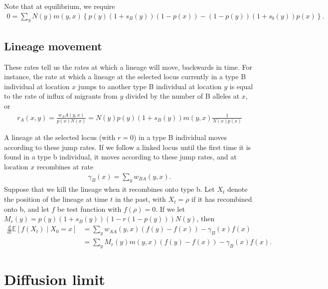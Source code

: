\documentclass{article}
\newcommand{\E}{\mathbb{E}}
\newcommand{\deriv}[1]{\frac{d}{d#1}}
\newcommand{\given}{\;\vert\;}
\begin{document}
Note that at equilibrium, we require
\begin{align}
  0 = \sum_y N(y) m(y,x) \left\{ p(y)(1+s_B(y))(1-p(x)) - (1-p(y))(1+s_b(y))p(x) \right\} .
\end{align}

\subsection{Lineage movement}

These rates tell us the rates at which a lineage will move, backwards in time.
For instance, the rate at which a lineage at the selected locus
currently in a type B individual at location $x$
jumps to another type B individual at location $y$ is equal to the rate of influx of migrants from $y$
divided by the number of B alleles at $x$,
or
\begin{align}
  r_A(x,y) = \frac{w_AA(y,x)}{p(x)N(x)} = N(y) p(y)  (1+s_B(y)) m(y,x) \frac{ 1 }{ N(x) p(x) }
\end{align}


A lineage at the selected locus (with $r=0$) in a type B individual moves according to these jump rates.
If we follow a linked locus until the first time it is found in a type b individual,
it moves according to these jump rates, and at location $x$ recombines at rate
\begin{align}
    \gamma_B(x) = \sum_y w_{BA}(y,x) .
\end{align}
Suppose that we kill the lineage when it recombines onto type b.
Let $X_t$ denote the position of the lineage at time $t$ in the past,
with $X_t = \rho$ if it has recombined onto b,
and let $f$ be test function with $f(\rho)=0$.
If we let $M_r(y) = p(y) (1+s_B(y)) \left(1 - r (1-p(y)) \right)  N(y)$, then
\begin{align}
    \deriv{t} \E[f(X_t) \given X_0=x ] &= \sum_y w_{AA}(y,x) ( f(y)-f(x) ) - \gamma_B(x) f(x) \\
                                       &= \sum_y  M_r(y) m(y,x) ( f(y) - f(x)  ) - \gamma_B(x) f(x) .
\end{align}

\section{Diffusion limit}
\end{document}
